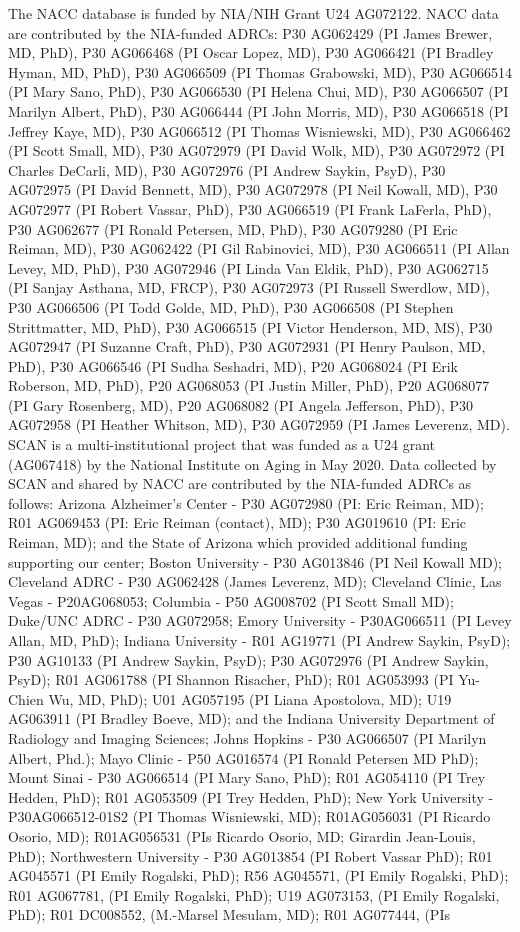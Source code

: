 \documentclass[conference]{IEEEtran}
\begin{document}
The NACC database is funded by NIA/NIH Grant U24 AG072122. NACC data are contributed by the NIA-funded ADRCs: P30 AG062429 (PI James Brewer, MD, PhD), P30 AG066468 (PI Oscar Lopez, MD), P30 AG066421 (PI Bradley Hyman, MD, PhD), P30 AG066509 (PI Thomas Grabowski, MD), P30 AG066514 (PI Mary Sano, PhD), P30 AG066530 (PI Helena Chui, MD), P30 AG066507 (PI Marilyn Albert, PhD), P30 AG066444 (PI John Morris, MD), P30 AG066518 (PI Jeffrey Kaye, MD), P30 AG066512 (PI Thomas Wisniewski, MD), P30 AG066462 (PI Scott Small, MD), P30 AG072979 (PI David Wolk, MD), P30 AG072972 (PI Charles DeCarli, MD), P30 AG072976 (PI Andrew Saykin, PsyD), P30 AG072975 (PI David Bennett, MD), P30 AG072978 (PI Neil Kowall, MD), P30 AG072977 (PI Robert Vassar, PhD), P30 AG066519 (PI Frank LaFerla, PhD), P30 AG062677 (PI Ronald Petersen, MD, PhD), P30 AG079280 (PI Eric Reiman, MD), P30 AG062422 (PI Gil Rabinovici, MD), P30 AG066511 (PI Allan Levey, MD, PhD), P30 AG072946 (PI Linda Van Eldik, PhD), P30 AG062715 (PI Sanjay Asthana, MD, FRCP), P30 AG072973 (PI Russell Swerdlow, MD), P30 AG066506 (PI Todd Golde, MD, PhD), P30 AG066508 (PI Stephen Strittmatter, MD, PhD), P30 AG066515 (PI Victor Henderson, MD, MS), P30 AG072947 (PI Suzanne Craft, PhD), P30 AG072931 (PI Henry Paulson, MD, PhD), P30 AG066546 (PI Sudha Seshadri, MD), P20 AG068024 (PI Erik Roberson, MD, PhD), P20 AG068053 (PI Justin Miller, PhD), P20 AG068077 (PI Gary Rosenberg, MD), P20 AG068082 (PI Angela Jefferson, PhD), P30 AG072958 (PI Heather Whitson, MD), P30 AG072959 (PI James Leverenz, MD). SCAN is a multi-institutional project that was funded as a U24 grant (AG067418) by the National Institute on Aging in May 2020. Data collected by SCAN and shared by NACC are contributed by the NIA-funded ADRCs as follows: Arizona Alzheimer's Center - P30 AG072980 (PI: Eric Reiman, MD); R01 AG069453 (PI: Eric Reiman (contact), MD); P30 AG019610 (PI: Eric Reiman, MD); and the State of Arizona which provided additional funding supporting our center; Boston University - P30 AG013846 (PI Neil Kowall MD); Cleveland ADRC - P30 AG062428 (James Leverenz, MD); Cleveland Clinic, Las Vegas - P20AG068053; Columbia - P50 AG008702 (PI Scott Small MD); Duke/UNC ADRC - P30 AG072958; Emory University - P30AG066511 (PI Levey Allan, MD, PhD); Indiana University - R01 AG19771 (PI Andrew Saykin, PsyD); P30 AG10133 (PI Andrew Saykin, PsyD); P30 AG072976 (PI Andrew Saykin, PsyD); R01 AG061788 (PI Shannon Risacher, PhD); R01 AG053993 (PI Yu-Chien Wu, MD, PhD); U01 AG057195 (PI Liana Apostolova, MD); U19 AG063911 (PI Bradley Boeve, MD); and the Indiana University Department of Radiology and Imaging Sciences; Johns Hopkins - P30 AG066507 (PI Marilyn Albert, Phd.); Mayo Clinic - P50 AG016574 (PI Ronald Petersen MD PhD); Mount Sinai - P30 AG066514 (PI Mary Sano, PhD); R01 AG054110 (PI Trey Hedden, PhD); R01 AG053509 (PI Trey Hedden, PhD); New York University - P30AG066512-01S2 (PI Thomas Wisniewski, MD); R01AG056031 (PI Ricardo Osorio, MD); R01AG056531 (PIs Ricardo Osorio, MD; Girardin Jean-Louis, PhD); Northwestern University - P30 AG013854 (PI Robert Vassar PhD); R01 AG045571 (PI Emily Rogalski, PhD); R56 AG045571, (PI Emily Rogalski, PhD); R01 AG067781, (PI Emily Rogalski, PhD); U19 AG073153, (PI Emily Rogalski, PhD); R01 DC008552, (M.-Marsel Mesulam, MD); R01 AG077444, (PIs 
\end{document}
